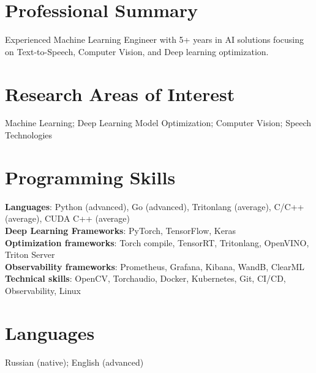 \section{\sc Professional Summary}
Experienced Machine Learning Engineer with 5+ years in AI solutions focusing on Text-to-Speech, Computer Vision, and Deep learning optimization.

\section{\sc Research Areas of Interest}
{Machine Learning; Deep Learning Model Optimization; Computer Vision; Speech Technologies}

\section{\sc Programming Skills}
\textbf{Languages}: Python (advanced), Go (advanced), Tritonlang (average), C/C++ (average), CUDA C++ (average) \\
\textbf{Deep Learning Frameworks}: PyTorch, TensorFlow, Keras \\
\textbf{Optimization frameworks}: Torch compile, TensorRT, Tritonlang, OpenVINO, Triton Server \\
\textbf{Observability frameworks}: Prometheus, Grafana, Kibana, WandB, ClearML \\
\textbf{Technical skills}: OpenCV, Torchaudio, Docker, Kubernetes, Git, CI/CD, Observability, Linux

\section{\sc Languages}
{Russian (native); English (advanced)}

\endinput
